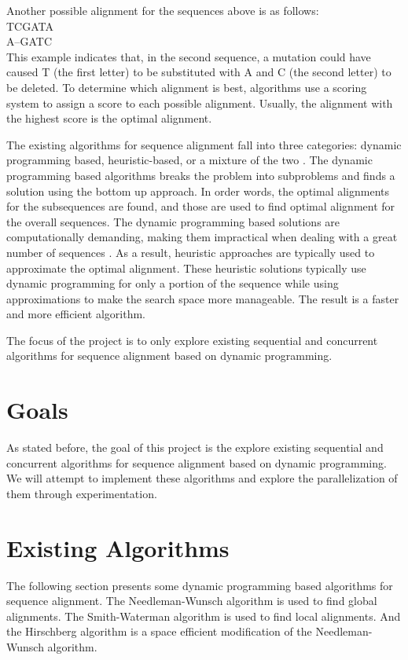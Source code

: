 \documentclass[conference]{IEEEtran}
\begin{document}
Another possible alignment for the sequences above is as follows:\\

\hspace*{1em}TCGATA\\
\hspace*{2em}A–GATC\\

This example indicates that, in the second sequence, a mutation could have caused T (the first letter) to be substituted with A and C (the second letter) to be deleted. To determine which alignment is best, algorithms use a scoring system to assign a score to each possible alignment. Usually, the alignment with the highest score is the optimal alignment.

The existing algorithms for sequence alignment fall into three categories: dynamic programming based, heuristic-based, or a mixture of the two \cite{chaudhary_liu_matta_yang_2005}. The dynamic programming based algorithms breaks the problem into subproblems and finds a solution using the bottom up approach. In order words, the optimal alignments for the subsequences are found, and those are used to find optimal alignment for the overall sequences. The dynamic programming based solutions are computationally demanding, making them impractical when dealing with a great number of sequences \cite{chaudhary_liu_matta_yang_2005}. As a result, heuristic approaches are typically used to approximate the optimal alignment. These heuristic solutions typically use dynamic programming for only a portion of the sequence while using approximations to make the search space more manageable. The result is a faster and more efficient algorithm.

The focus of the project is to only explore existing sequential and concurrent algorithms for sequence alignment based on dynamic programming.

\section{Goals}
As stated before, the goal of this project is the explore existing sequential and concurrent algorithms for sequence alignment based on dynamic programming. We will attempt to implement these algorithms and explore the parallelization of them through experimentation.

\section{Existing Algorithms}
The following section presents some dynamic programming based algorithms for sequence alignment. The Needleman-Wunsch algorithm is used to find global alignments. The Smith-Waterman algorithm is used to find local alignments. And the Hirschberg algorithm is a space efficient modification of the Needleman-Wunsch algorithm.
\end{document}
